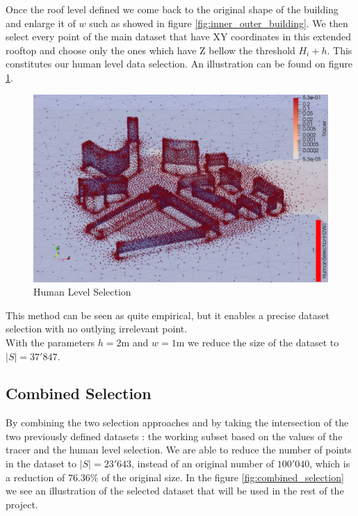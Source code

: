 Once the roof level defined we come back to the original shape of the building and enlarge it of $w$ such as showed in figure \ref{fig:inner_outer_building}. We then select every point of the main dataset that have XY coordinates in this extended rooftop and   choose only the ones which have Z bellow the threshold $H_i + h$. This constitutes our human level data selection. An illustration can be found on figure \ref{fig:human_selection}. \\

\begin{figure}[h!]
\centering
	\includegraphics[width = 0.8 \linewidth]{figures/Subset/HumanSelectionH2W1_zoom}
	\caption{Human Level Selection}
	\label{fig:human_selection}
\end{figure}

This method can be seen as quite empirical, but it enables a precise dataset selection with no outlying irrelevant point. \\

With the parameters $h = 2$m and $w = 1$m we reduce the size of the dataset to $|S| = 37'847$. 


\subsection{Combined Selection}

By combining the two selection approaches and by taking the intersection of the two previously defined datasets : the working subset based on the values of the tracer and the human level selection. We are able to reduce the number of points in the dataset to $|S| = 23'643$, instead of an original number of $100'040$, which is a reduction of $76.36\%$ of the original size. In the figure \ref{fig:combined_selection} we see an illustration of the selected dataset that will be used in the rest of the project. 

